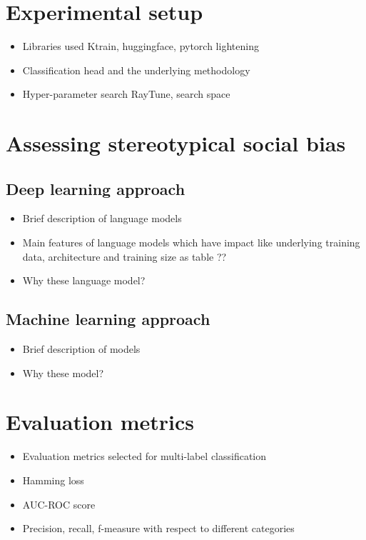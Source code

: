 \section{Experimental setup}
\begin{itemize}
    \item Libraries used {Ktrain, huggingface, pytorch lightening}
    \item Classification head and the underlying methodology 
    \item Hyper-parameter search {RayTune}, search space
\end{itemize}
\section{Assessing stereotypical social bias}
\subsection{Deep learning approach}
\begin{itemize}
    \item Brief description of language models
    \item Main features of language models which have impact like underlying training data, architecture and training size as table ??
    \item Why these language model?
\end{itemize}
\subsection{Machine learning approach}
    \begin{itemize}
        \item Brief description of  models
        \item Why these model?
    \end{itemize}
\section{Evaluation metrics \cite{tsoumakas2007multi}}
    \begin{itemize}
        \item Evaluation metrics selected for multi-label classification 
        \item Hamming loss 
        \item AUC-ROC score 
        \item Precision, recall, f-measure with respect to different categories
    \end{itemize}
    